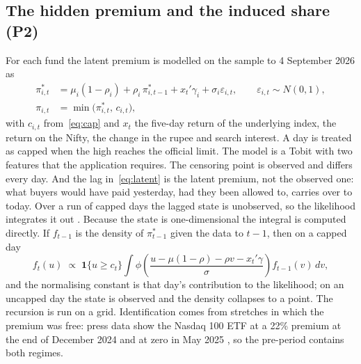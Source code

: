 \subsection{The hidden premium and the induced share (P2)}
For each fund the latent premium is modelled on the sample to 4 September 2026 as
\begin{align}
\pi^{*}_{i,t}&=\mu_i(1-\rho_i)+\rho_i\,\pi^{*}_{i,t-1}+x_t'\gamma_i+\sigma_i\varepsilon_{i,t},\qquad \varepsilon_{i,t}\sim N(0,1),\label{eq:latent}\\
\pi_{i,t}&=\min\big(\pi^{*}_{i,t},\,c_{i,t}\big),\label{eq:obs}
\end{align}
with $c_{i,t}$ from~\eqref{eq:cap} and $x_t$ the five-day return of the underlying index, the return on the Nifty, the change in the rupee and search interest. A day is treated as capped when the high reaches the official limit. The model is a Tobit \citep{tobin1958estimation} with two features that the application requires. The censoring point is observed and differs every day. And the lag in~\eqref{eq:latent} is the latent premium, not the observed one: what buyers would have paid yesterday, had they been allowed to, carries over to today. Over a run of capped days the lagged state is unobserved, so the likelihood integrates it out \citep{lee1999estimation}. Because the state is one-dimensional the integral is computed directly. If $f_{t-1}$ is the density of $\pi^{*}_{t-1}$ given the data to $t-1$, then on a capped day
\begin{equation}\label{eq:filter}
f_{t}(u)\;\propto\;\mathbf{1}\{u\ge c_{t}\}\int\phi\!\left(\frac{u-\mu(1-\rho)-\rho v-x_t'\gamma}{\sigma}\right)f_{t-1}(v)\,dv ,
\end{equation}
and the normalising constant is that day's contribution to the likelihood; on an uncapped day the state is observed and the density collapses to a point. The recursion is run on a grid. Identification comes from stretches in which the premium was free: press data show the Nasdaq 100 ETF at a 22\% premium at the end of December 2024 and at zero in May 2025 \citep{vr2025premium}, so the pre-period contains both regimes.

